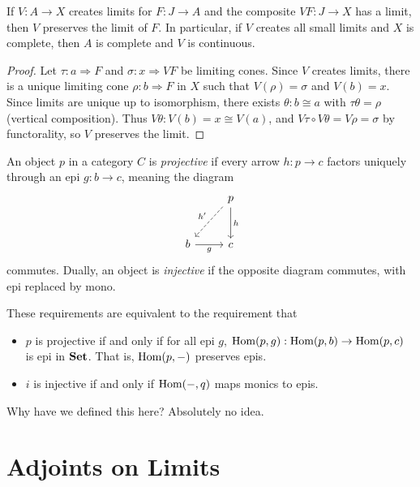 \begin{theorem}\label{thm:5.8}
	If $V : A \to X$ creates limits for $F : J \to A$ and the composite $VF : J \to X$ has a limit, then $V$ preserves the limit of $F$. In particular, if $V$ creates all small limits and $X$ is complete, then $A$ is complete and $V$ is continuous.
\end{theorem}
\begin{proof}
	Let $\tau : a \Rightarrow F$ and $\sigma : x \Rightarrow VF$ be limiting cones. Since $V$ creates limits, there is a unique limiting cone $\rho : b \Rightarrow F$ in $X$ such that $V(\rho )=\sigma $ and $V(b)=x$. Since limits are unique up to isomorphism, there exists $\theta : b\cong a$ with $\tau \theta =\rho $ (vertical composition). Thus $V\theta : V(b)=x \cong V(a)$, and $V\tau \circ V\theta =V\rho =\sigma $ by functorality, so $V$ preserves the limit.
\end{proof}

\begin{definition}\label{dfn:5.4}
	An object $p$ in a category $C$ is \emph{projective} if every arrow $h : p \to c$ factors uniquely through an epi $g : b \to c$, meaning the diagram
	\[\begin{tikzcd}[row sep = 2.5em, column sep = 2.5em]
	 & p\ar[" h ", d] \ar[" h' "', dashed, dl]  \\
	b \ar[" g "', r]  & c
	\end{tikzcd}\]
	commutes. Dually, an object is \emph{injective} if the opposite diagram commutes, with epi replaced by mono.
\end{definition}

These requirements are equivalent to the requirement that
\begin{itemize}
	\item $p$ is projective if and only if for all epi $g$, $\operatorname{Hom}(p, g) : \operatorname{Hom}(p, b) \to \operatorname{Hom}(p, c)$ is epi in $\mathbf{Set} $. That is, $\operatorname{Hom}(p, -) $ preserves epis.
	\item $i$ is injective if and only if $\operatorname{Hom}(-, q) $ maps monics to epis.
\end{itemize}
Why have we defined this here? Absolutely no idea.

\section{Adjoints on Limits}

